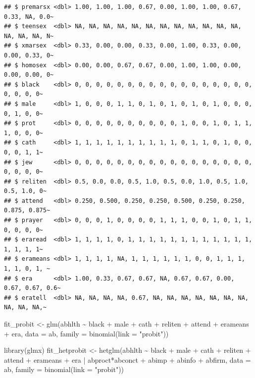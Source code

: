 \documentclass[
]{book}
\newenvironment{Shaded}{\begin{snugshade}}{\end{snugshade}}
\newcommand{\AttributeTok}[1]{\textcolor[rgb]{0.77,0.63,0.00}{#1}}
\newcommand{\FunctionTok}[1]{\textcolor[rgb]{0.00,0.00,0.00}{#1}}
\newcommand{\NormalTok}[1]{#1}
\newcommand{\OtherTok}[1]{\textcolor[rgb]{0.56,0.35,0.01}{#1}}
\newcommand{\SpecialCharTok}[1]{\textcolor[rgb]{0.00,0.00,0.00}{#1}}
\newcommand{\StringTok}[1]{\textcolor[rgb]{0.31,0.60,0.02}{#1}}
\begin{document}
\begin{verbatim}
## $ premarsx <dbl> 1.00, 1.00, 1.00, 0.67, 0.00, 1.00, 1.00, 0.67, 0.33, NA, 0.0~
## $ teensex  <dbl> NA, NA, NA, NA, NA, NA, NA, NA, NA, NA, NA, NA, NA, NA, NA, N~
## $ xmarsex  <dbl> 0.33, 0.00, 0.00, 0.33, 0.00, 1.00, 0.33, 0.00, 0.00, 0.33, 0~
## $ homosex  <dbl> 0.00, 0.00, 0.67, 0.67, 0.00, 1.00, 1.00, 0.00, 0.00, 0.00, 0~
## $ black    <dbl> 0, 0, 0, 0, 0, 0, 0, 0, 0, 0, 0, 0, 0, 0, 0, 0, 0, 0, 0, 0, 0~
## $ male     <dbl> 1, 0, 0, 0, 1, 1, 0, 1, 0, 1, 0, 1, 0, 1, 0, 0, 0, 0, 1, 0, 0~
## $ prot     <dbl> 0, 0, 0, 0, 0, 0, 0, 0, 0, 0, 1, 0, 0, 1, 0, 1, 1, 1, 0, 0, 0~
## $ cath     <dbl> 1, 1, 1, 1, 1, 1, 1, 1, 1, 1, 0, 1, 1, 0, 1, 0, 0, 0, 0, 1, 1~
## $ jew      <dbl> 0, 0, 0, 0, 0, 0, 0, 0, 0, 0, 0, 0, 0, 0, 0, 0, 0, 0, 0, 0, 0~
## $ reliten  <dbl> 0.5, 0.0, 0.0, 0.5, 1.0, 0.5, 0.0, 1.0, 0.5, 1.0, 0.5, 1.0, 0~
## $ attend   <dbl> 0.250, 0.500, 0.250, 0.250, 0.500, 0.250, 0.250, 0.875, 0.875~
## $ prayer   <dbl> 0, 0, 0, 1, 0, 0, 0, 0, 1, 1, 1, 0, 0, 1, 0, 1, 1, 0, 0, 0, 0~
## $ eraread  <dbl> 1, 1, 1, 1, 0, 1, 1, 1, 1, 1, 1, 1, 1, 1, 1, 1, 1, 1, 1, 1, 1~
## $ erameans <dbl> 1, 1, 1, 1, NA, 1, 1, 1, 1, 1, 1, 0, 0, 1, 1, 1, 1, 1, 0, 1, ~
## $ era      <dbl> 1.00, 0.33, 0.67, 0.67, NA, 0.67, 0.67, 0.00, 0.67, 0.67, 0.6~
## $ eratell  <dbl> NA, NA, NA, NA, 0.67, NA, NA, NA, NA, NA, NA, NA, NA, NA, NA,~
\end{verbatim}

\begin{Shaded}
\begin{Highlighting}[]
\NormalTok{fit\_probit }\OtherTok{\textless{}{-}} \FunctionTok{glm}\NormalTok{(abhlth }\SpecialCharTok{\textasciitilde{}}\NormalTok{ black }\SpecialCharTok{+}\NormalTok{ male }\SpecialCharTok{+}\NormalTok{ cath }\SpecialCharTok{+}\NormalTok{ reliten }\SpecialCharTok{+}\NormalTok{ attend }\SpecialCharTok{+}\NormalTok{ erameans }\SpecialCharTok{+}\NormalTok{ era, }
                  \AttributeTok{data =}\NormalTok{ ab, }\AttributeTok{family =} \FunctionTok{binomial}\NormalTok{(}\AttributeTok{link =} \StringTok{"probit"}\NormalTok{))}

\FunctionTok{library}\NormalTok{(glmx)}
\NormalTok{fit\_hetprobit }\OtherTok{\textless{}{-}} \FunctionTok{hetglm}\NormalTok{(abhlth }\SpecialCharTok{\textasciitilde{}}\NormalTok{ black }\SpecialCharTok{+}\NormalTok{ male }\SpecialCharTok{+}\NormalTok{ cath }\SpecialCharTok{+}\NormalTok{ reliten }\SpecialCharTok{+}\NormalTok{ attend }\SpecialCharTok{+}\NormalTok{ erameans }\SpecialCharTok{+}\NormalTok{ era }\SpecialCharTok{|} 
\NormalTok{                       abproct}\SpecialCharTok{*}\NormalTok{abconct }\SpecialCharTok{+}\NormalTok{ abimp }\SpecialCharTok{+}\NormalTok{ abinfo }\SpecialCharTok{+}\NormalTok{ abfirm, }
                  \AttributeTok{data =}\NormalTok{ ab, }\AttributeTok{family =} \FunctionTok{binomial}\NormalTok{(}\AttributeTok{link =} \StringTok{"probit"}\NormalTok{))}
\end{Highlighting}
\end{Shaded}
\end{document}
